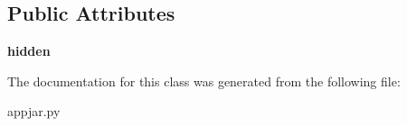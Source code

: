 \subsection*{Public Attributes}
\begin{DoxyCompactItemize}
\item 
\mbox{\label{class_python_01_g_u_i_1_1appjar_1_1_auto_scrollbar_a6988167080a464138e7199416929b112}} 
{\bfseries hidden}
\end{DoxyCompactItemize}


The documentation for this class was generated from the following file\+:\begin{DoxyCompactItemize}
\item 
appjar.\+py\end{DoxyCompactItemize}
